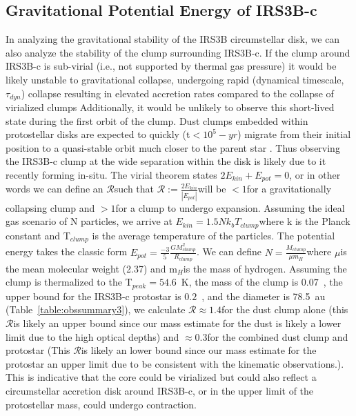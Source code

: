 \subsection{Gravitational Potential Energy of IRS3B-c}\label{sec:gpe}
In analyzing the gravitational stability of the IRS3B circumstellar disk, we can also analyze the stability of the clump surrounding IRS3B-c. If the clump around IRS3B-c is sub-virial (i.e., not supported by thermal gas pressure) it would be likely unstable to gravitational collapse, undergoing rapid (dynamical timescale, $\tau_{dyn}$) collapse resulting in elevated accretion rates compared to the collapse of virialized clumps Additionally, it would be unlikely to observe this short-lived state during the first orbit of the clump. Dust clumps embedded within protostellar disks are expected to quickly (t$<10^{5}-yr$) migrate from their initial position to a quasi-stable orbit much closer to the parent star \citep{2019AA...631A...1V}. Thus observing the IRS3B-c clump at the wide separation within the disk is likely due to it recently forming in-situ. The virial theorem states $2E_{kin} + E_{pot}=0$, or in other words we can define an $\mathcal{R}$\space such that $\mathcal{R} := \frac{2E_{kin}}{|E_{pot}|}$\space will be $<1$\space for a gravitationally collapsing clump and $>1$\space for a clump to undergo expansion. Assuming the ideal gas scenario of N particles, we arrive at $E_{kin} = 1.5Nk_{b}T_{clump}$\space where k is the Planck constant and T$_{clump}$ is the average temperature of the particles. The potential energy takes the classic form $E_{pot} = \frac{-3}{5}\frac{GM^{2}_{clump}}{R_{clump}}$. We can define $N=\frac{M_{clump}}{\mu m_{H}}$\space where $\mu$\space is the mean molecular weight (2.37) and m$_{H}$\space is the mass of hydrogen. Assuming the clump is thermalized to the T$_{peak}=54.6$~K, the mass of the clump is $0.07$~\solm, the upper bound for the IRS3B-c protostar is $0.2$~\solm, and the diameter is 78.5~au (Table~\ref{table:obssummary3}), we calculate $\mathcal{R} \approx1.4$\space for the dust clump alone (this $\mathcal{R}$\space is likely an upper bound since our mass estimate for the dust is likely a lower limit due to the high optical depths) and $\approx0.3$\space for the combined dust clump and protostar (This $\mathcal{R}$\space is likely an lower bound since our mass estimate for the protostar an upper limit due to be consistent with the kinematic observations.). This is indicative that the core could be virialized but could also reflect a circumstellar accretion disk around IRS3B-c, or in the upper limit of the protostellar mass, could undergo contraction.


